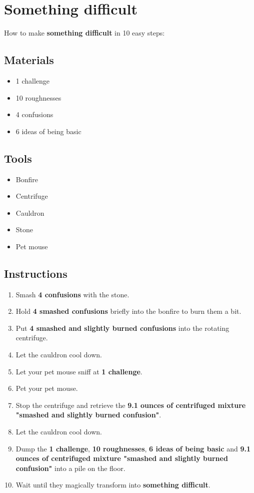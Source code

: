 \documentclass{article}
\begin{document}
\section{Something difficult}How to make \textbf{something difficult} in 10 easy steps:

\subsection{Materials}\begin{itemize}
\item 
1 challenge
\item 
10 roughnesses
\item 
4 confusions
\item 
6 ideas of being basic
\end{itemize}
\subsection{Tools}\begin{itemize}
\item 
Bonfire
\item 
Centrifuge
\item 
Cauldron
\item 
Stone
\item 
Pet mouse
\end{itemize}
\subsection{Instructions}\begin{enumerate}
\item 
Smash \textbf{4 confusions} with the stone.
\item 
Hold \textbf{4 smashed confusions} briefly into the bonfire to burn them a bit.
\item 
Put \textbf{4 smashed and slightly burned confusions} into the rotating centrifuge.
\item 
Let the cauldron cool down.
\item 
Let your pet mouse sniff at \textbf{1 challenge}.
\item 
Pet your pet mouse.
\item 
Stop the centrifuge and retrieve the \textbf{9.1 ounces of centrifuged mixture "smashed and slightly burned confusion"}.
\item 
Let the cauldron cool down.
\item 
Dump the \textbf{1 challenge}, \textbf{10 roughnesses}, \textbf{6 ideas of being basic} and \textbf{9.1 ounces of centrifuged mixture "smashed and slightly burned confusion"} into a pile on the floor.
\item 
Wait until they magically transform into \textbf{something difficult}.
\end{enumerate}
\newpage
\end{document}
